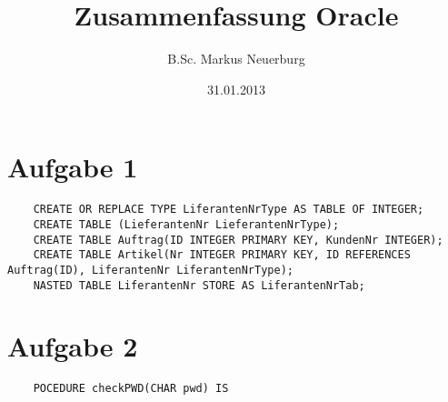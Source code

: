 \documentclass[12pt]{scrreprt}
\title{Zusammenfassung Oracle}
\author{B.Sc. Markus Neuerburg}
\date{31.01.2013}
\begin{document}
\setlength{\topmargin}{0cm}
\parindent 0pt
\chapter*{Aufgabe 1}
\begin{lstlisting}
	CREATE OR REPLACE TYPE LiferantenNrType AS TABLE OF INTEGER;
	CREATE TABLE (LieferantenNr LieferantenNrType);
	CREATE TABLE Auftrag(ID INTEGER PRIMARY KEY, KundenNr INTEGER);
	CREATE TABLE Artikel(Nr INTEGER PRIMARY KEY, ID REFERENCES Auftrag(ID), LiferantenNr LiferantenNrType);
	NASTED TABLE LiferantenNr STORE AS LiferantenNrTab;
\end{lstlisting}

\chapter*{Aufgabe 2}
\begin{lstlisting}
	POCEDURE checkPWD(CHAR pwd) IS
\end{lstlisting}
\end{document}
